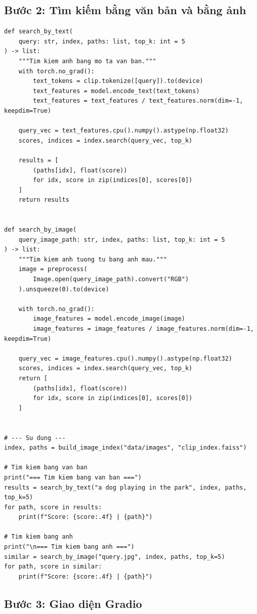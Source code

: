\subsection{Bước 2: Tìm kiếm bằng văn bản và bằng ảnh}
\label{subsec:clip_search}

\begin{verbatim}
def search_by_text(
    query: str, index, paths: list, top_k: int = 5
) -> list:
    """Tim kiem anh bang mo ta van ban."""
    with torch.no_grad():
        text_tokens = clip.tokenize([query]).to(device)
        text_features = model.encode_text(text_tokens)
        text_features = text_features / text_features.norm(dim=-1, keepdim=True)

    query_vec = text_features.cpu().numpy().astype(np.float32)
    scores, indices = index.search(query_vec, top_k)

    results = [
        (paths[idx], float(score))
        for idx, score in zip(indices[0], scores[0])
    ]
    return results


def search_by_image(
    query_image_path: str, index, paths: list, top_k: int = 5
) -> list:
    """Tim kiem anh tuong tu bang anh mau."""
    image = preprocess(
        Image.open(query_image_path).convert("RGB")
    ).unsqueeze(0).to(device)

    with torch.no_grad():
        image_features = model.encode_image(image)
        image_features = image_features / image_features.norm(dim=-1, keepdim=True)

    query_vec = image_features.cpu().numpy().astype(np.float32)
    scores, indices = index.search(query_vec, top_k)
    return [
        (paths[idx], float(score))
        for idx, score in zip(indices[0], scores[0])
    ]


# --- Su dung ---
index, paths = build_image_index("data/images", "clip_index.faiss")

# Tim kiem bang van ban
print("=== Tim kiem bang van ban ===")
results = search_by_text("a dog playing in the park", index, paths, top_k=5)
for path, score in results:
    print(f"Score: {score:.4f} | {path}")

# Tim kiem bang anh
print("\n=== Tim kiem bang anh ===")
similar = search_by_image("query.jpg", index, paths, top_k=5)
for path, score in similar:
    print(f"Score: {score:.4f} | {path}")
\end{verbatim}

\subsection{Bước 3: Giao diện Gradio}
\label{subsec:clip_gradio}

